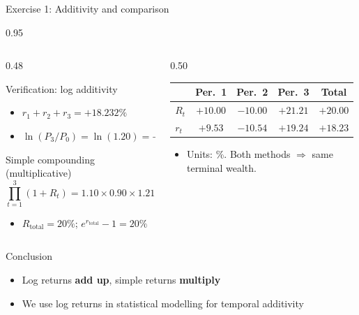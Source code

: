 \documentclass[9pt, aspectratio=169, t]{beamer}
\begin{document}
\begin{frame}[shrink=5]{Exercise 1: Additivity and comparison}
    \begin{cminipage}{0.95\textwidth}
    \begin{columns}[T]
    \begin{column}{0.48\textwidth}
    \begin{exampleblock}{Verification: log additivity}
    \begin{itemize}\setlength{\itemsep}{0pt}
        \item $r_1 + r_2 + r_3 = \mathbf{+18.232\%}$
        \item $\ln(P_3/P_0) = \ln(1.20) = \mathbf{+18.232\%}$ \checkmark
    \end{itemize}
    \end{exampleblock}
    \begin{block}{Simple compounding (multiplicative)}
    \[
    \textstyle\prod_{t=1}^{3}(1+R_t) = 1.10 \times 0.90 \times 1.2121 = 1.20
    \]
    \begin{itemize}\setlength{\itemsep}{0pt}
        \item $R_{\text{total}} = 20\%$; \; $e^{r_{\text{total}}} - 1 = 20\%$ \checkmark
    \end{itemize}
    \end{block}
    \end{column}
    \begin{column}{0.50\textwidth}
    \begin{center}
    {\small
    \renewcommand{\arraystretch}{1.2}
    \begin{tabular}{lcccc}
    \toprule
    & Per.\ 1 & Per.\ 2 & Per.\ 3 & \textbf{Total} \\
    \midrule
    $R_t$ & $+10.00$ & $-10.00$ & $+21.21$ & $+20.00$ \\
    $r_t$ & $+9.53$ & $-10.54$ & $+19.24$ & $+18.23$ \\
    \bottomrule
    \end{tabular}
    }
    \end{center}
    \vspace{0.1cm}
    \begin{itemize}\setlength{\itemsep}{0pt}
        \item {\footnotesize Units: \%. Both methods $\Rightarrow$ same terminal wealth.}
    \end{itemize}
    \end{column}
    \end{columns}
    \vspace{0.1cm}
    \begin{alertblock}{Conclusion}
    \begin{itemize}\setlength{\itemsep}{0pt}
        \item Log returns \textbf{add up}, simple returns \textbf{multiply}
        \item We use log returns in statistical modelling for temporal additivity
    \end{itemize}
    \end{alertblock}
    \end{cminipage}
\end{frame}
\end{document}
